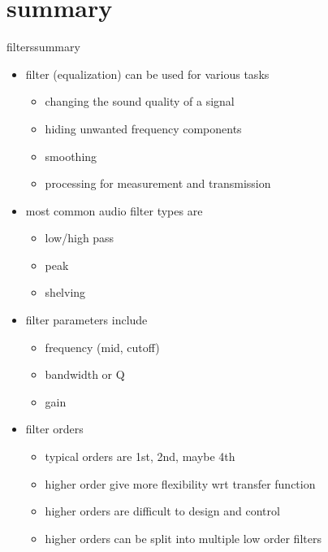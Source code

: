 	\section{summary}	
        \begin{frame}{filters}{summary}
            \vspace{-3mm}
            \begin{itemize}
                \item   filter (equalization) can be used for various tasks
                    \begin{itemize}
                        \item   changing the sound quality of a signal
                        \item   hiding unwanted frequency components
                        \item   smoothing
                        \item   processing for measurement and transmission
                    \end{itemize}
                \item<2->   most common audio filter types are
                    \begin{itemize}
                        \item   low/high pass
                        \item   peak
                        \item   shelving
                    \end{itemize}
                \item<3->   filter parameters include
                    \begin{itemize}
                        \item   frequency (mid, cutoff)
                        \item   bandwidth or Q
                        \item   gain
                    \end{itemize}
                \item<4->   filter orders
                    \begin{itemize}
                        \item   typical orders are 1st, 2nd, maybe 4th
                        \item   higher order give more flexibility wrt transfer function
                        \item   higher orders are difficult to design and control
                        \item   higher orders can be split into multiple low order filters
                    \end{itemize}
            \end{itemize}
        \end{frame}
 



